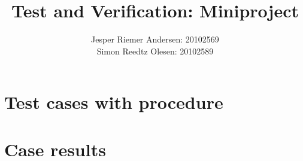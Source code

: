 \documentclass[a4paper,12pt]{report}
\title{Test and Verification: Miniproject}
\author{Jesper Riemer Andersen: 20102569\\Simon Reedtz Olesen: 20102589}
\begin{document}
\maketitle

\pagebreak
\section*{Test cases with procedure}


\section*{Case results}

\end{document}
